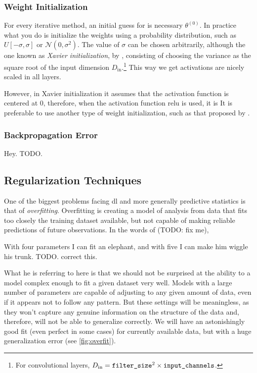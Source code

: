 \subsubsection{Weight Initialization}

For every iterative method, an initial guess for is necessary
\(\theta^{(0)}\). In practice what you do is initialize the weights using a
probability distribution, such as \(U[-\sigma, \sigma]\) or
\(\mathcal{N}(0, \sigma ^ 2)\). The value of \(\sigma\) can be chosen
arbitrarily, although the one known as \emph{Xavier initialization}, by
, consisting of choosing the variance as the square root
of the input dimension \(D_{\text{in}}\).\footnote{For convolutional layers,
  \(D_{\text{in}} = \text{\texttt{filter\_size}}^2 \times
  \text{\texttt{input\_channels}}\).} This way we get activations are nicely
scaled in all layers.

However, in Xavier initialization it assumes that the activation function is
centered at 0, therefore, when the activation function \gls{relu} is used, it
is It is preferable to use another type of weight initialization, such as that
proposed by .

\subsubsection{Backpropagation Error}

Hey. TODO.


\subsection{Regularization Techniques}

One of the biggest problems facing \gls{dl} and more generally predictive
statistics is that of \emph{overfitting}. Overfitting is
creating a model of analysis from data that fits too closely the training
dataset available, but not capable of making reliable predictions of future
observations. In the words of  (TODO:
fix me),
\begin{quoteBox}
  With four parameters I can fit an elephant, and with five I can make him
  wiggle his trunk.
  \tcblower{} TODO. correct this.
\end{quoteBox}

What he is referring to here is that we should not be surprised at the ability
to a model complex enough to fit a given dataset very well. Models with a large
number of parameters are capable of adjusting to any given amount of data, even
if it appears not to follow any pattern. But these settings will be
meaningless, as they won't capture any genuine information on the structure of
the data and, therefore, will not be able to generalize correctly. We will have
an astonishingly good fit (even perfect in some cases) for currently available
data, but with a huge generalization error (see \vref{fig:overfit}).

